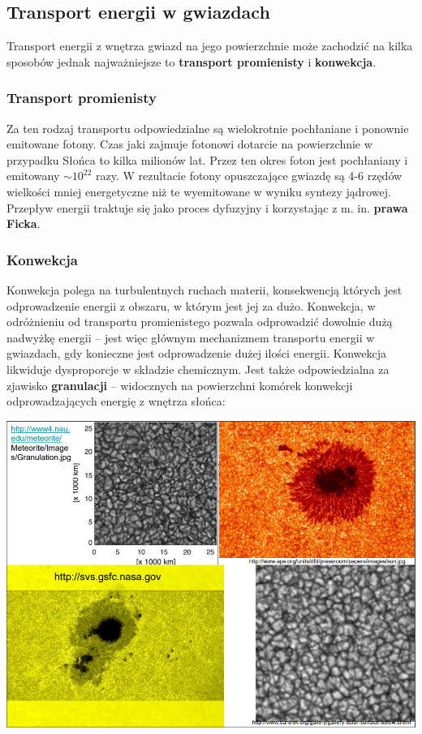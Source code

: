 \documentclass[../index.tex]{subfiles}
\begin{document}
        \subsection{Transport energii w gwiazdach}
            Transport energii z wnętrza gwiazd na jego powierzchnie może zachodzić na kilka sposobów jednak najważniejsze to \textbf{transport promienisty} i \textbf{konwekcja}.
            \subsubsection{Transport promienisty}
                Za ten rodzaj transportu odpowiedzialne są wielokrotnie pochłaniane i ponownie emitowane fotony. Czas jaki zajmuje fotonowi dotarcie na powierzchnie w przypadku Słońca to kilka milionów lat. Przez ten okres foton jest pochłaniany i emitowany \(\sim 10^{22}\) razy. W rezultacie fotony opuszczające gwiazdę są 4-6 rzędów wielkości mniej energetyczne niż te wyemitowane w wyniku syntezy jądrowej. Przepływ energii traktuje się jako proces dyfuzyjny i korzystając z m. in. \textbf{prawa Ficka}.
            \subsubsection{Konwekcja}
                Konwekcja polega na turbulentnych ruchach materii, konsekwencją których jest odprowadzenie energii z obszaru, w którym jest jej za dużo. Konwekcja, w odróżnieniu od transportu promienistego pozwala odprowadzić dowolnie dużą nadwyżkę energii \--- jest więc głównym mechanizmem transportu energii w gwiazdach, gdy konieczne jest odprowadzenie dużej ilości energii. Konwekcja likwiduje dysproporcje w składzie chemicznym. Jest także odpowiedzialna za zjawisko \textbf{granulacji} \--- widocznych na powierzchni komórek konwekcji odprowadzających energię z wnętrza słońca:
                \begin{center}
                    \includegraphics[width=15cm]{images/granule.png}
                \end{center}
\end{document}
